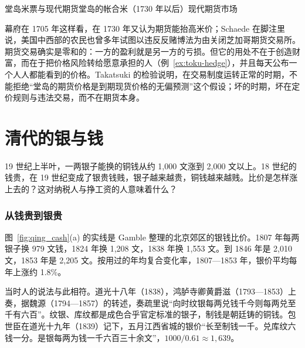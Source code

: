 \begin{compare}{堂岛米票与现代期货}{堂岛的帐合米（1730 年以后）}{现代期货市场}
\end{compare}

\begin{pitfall}[期货市场只是赌场]
幕府在 1705 年这样看，在 1730 年又认为期货能抬高米价；Schaede 在脚注里说，美国中西部的农民也曾多年试图以违反反赌博法为由关闭芝加哥期货交易所\cite{schaede1989}。期货交易确实是零和的：一方的盈利就是另一方的亏损。但它的用处不在于创造财富，而在于把价格风险转给愿意承担的人（例~\ref{ex:toku-hedge}），并且每天公布一个人人都能看到的价格。Takatsuki 的检验说明，在交易制度运转正常的时期，不能拒绝“堂岛的期货价格是到期现货价格的无偏预测”这个假设；坏的时期，坏在定价规则与违法交易，而不在期货本身。
\end{pitfall}

\section{清代的银与钱}\label{sec:toku-qing}

19 世纪上半叶，一两银子能换的铜钱从约 1,000 文涨到 2,000 文以上。18 世纪的钱贵，在 19 世纪变成了银贵钱贱，银子越来越贵，铜钱越来越贱。比价是怎样涨上去的？这对纳税人与挣工资的人意味着什么？

\subsubsection{从钱贵到银贵}
图~\ref{fig:qing_cash}(a) 的实线是 Gamble 整理的北京郊区的银钱比价。1807 年每两银子换 979 文钱，1824 年换 1,208 文，1838 年换 1,553 文。到 1846 年是 2,010 文，1853 年是 2,205 文\cite{gamble1943}。按用过的年均复合变化率，1807—1853 年，银价平均每年上涨约 1.8\%。

当时人的说法与此相符。道光十八年（1838），鸿胪寺卿黄爵滋（1793—1853）上奏，据魏源（1794—1857）的转述，奏疏里说“向时纹银每两兑钱千今则每两兑至千有六百”\cite{xubiange}。纹银、库纹都是成色合乎官定标准的银子，制钱是朝廷铸的铜钱。包世臣在道光十九年（1839）记下，五月江西省城的银价“长至制钱一千。兑库纹六钱一分。是银每两为钱一千六百三十余文”\cite{xubiansheng}，$1000/0.61\approx1{,}639$。

